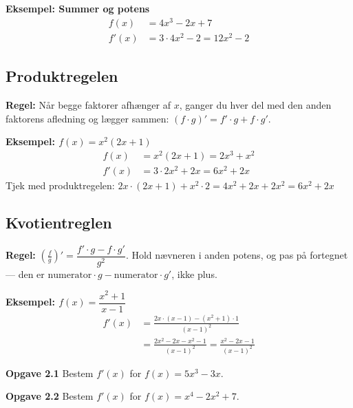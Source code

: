 \documentclass[11pt,a4paper]{article}
\begin{document}
\textbf{Eksempel: Summer og potens}
\begin{align*}
  f(x) &= 4x^{3} - 2x + 7\\
  f'(x) &= 3 \cdot 4x^{2} - 2 = 12x^{2} - 2
\end{align*}

\subsection*{Produktregelen}

\begin{regelbox}
\textbf{Regel:} Når begge faktorer afhænger af $x$, ganger du hver del med
den anden faktorens afledning og lægger sammen:
$(f \cdot g)' = f' \cdot g + f \cdot g'$.
\end{regelbox}

\textbf{Eksempel: $f(x) = x^{2}(2x + 1)$}
\begin{align*}
  f(x) &= x^{2}(2x+1) = 2x^{3} + x^{2}\\
  f'(x) &= 3 \cdot 2x^{2} + 2x = 6x^{2} + 2x
\end{align*}
Tjek med produktregelen: $2x \cdot (2x+1) + x^{2} \cdot 2 = 4x^{2} + 2x +
2x^{2} = 6x^{2} + 2x$ \checkmark

\subsection*{Kvotientreglen}

\begin{regelbox}
\textbf{Regel:} $\left(\frac{f}{g}\right)' = \dfrac{f' \cdot g - f \cdot g'}{g^{2}}$.
Hold nævneren i anden potens, og pas på fortegnet --- den er
$\text{numerator} \cdot g - \text{numerator} \cdot g'$, ikke plus.
\end{regelbox}

\textbf{Eksempel: $f(x) = \dfrac{x^{2}+1}{x-1}$}
\begin{align*}
  f'(x) &= \frac{2x \cdot (x-1) - (x^{2}+1) \cdot 1}{(x-1)^{2}}\\[4pt]
        &= \frac{2x^{2} - 2x - x^{2} - 1}{(x-1)^{2}}
         = \frac{x^{2} - 2x - 1}{(x-1)^{2}}
\end{align*}

\begin{opgavebox}
\textbf{Opgave 2.1} \quad Bestem $f'(x)$ for $f(x) = 5x^{3} - 3x$.
\end{opgavebox}

\begin{opgavebox}
\textbf{Opgave 2.2} \quad Bestem $f'(x)$ for $f(x) = x^{4} - 2x^{2} + 7$.
\end{opgavebox}
\end{document}
